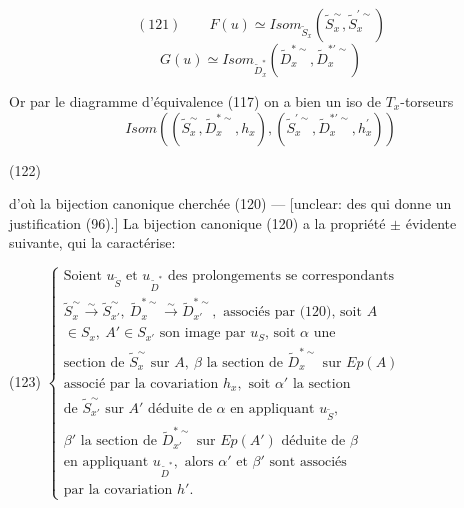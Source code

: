 $$ (121) \qquad F(u) \simeq Isom_{\tilde{S}_x}(\tilde{S}_x^\sim, \tilde{S}_x^{\prime \sim}) $$
$$ G(u) \simeq Isom_{\tilde{D}_x^*}(\tilde{D}_x^{*\sim}, \tilde{D}_x^{* \prime \sim}) $$

Or par le diagramme d'équivalence (117) on
a bien un iso de $T_x$-torseurs
$$ Isom((\tilde{S}_x^\sim, \tilde{D}_x^{*\sim}, h_x), (\tilde{S}_x^{\prime \sim}, \tilde{D}_x^{* \prime \sim}, h_x^\prime)) $$

(122)

d'où la bijection canonique cherchée (120) —
[unclear: des qui donne un justification (96).]
La bijection canonique (120) a la
propriété $\pm$ évidente suivante, qui la caractérise:

(123) $\begin{cases}
\text{Soient } u_{\tilde{S}} \text{ et } u_{\tilde{D}^*} \text{ des prolongements se correspondants} \\
\tilde{S}_x^\sim \xrightarrow{\sim} \tilde{S}_{x'}^\sim, \ \tilde{D}_x^{*\sim} \xrightarrow{\sim} \tilde{D}_{x'}^{* \sim}, \text{ associés par (120), soit } A \\
\in S_x, \ A' \in S_{x'} \text{ son image par } u_S \text{, soit } \alpha \text{ une} \\
\text{section de } \tilde{S}_x^\sim \text{ sur } A, \ \beta \text{ la section de } \tilde{D}_x^{*\sim} \text{ sur } Ep(A) \\
\text{associé par la covariation } h_x, \text{ soit } \alpha' \text{ la section} \\
\text{de } \tilde{S}_{x'}^\sim \text{ sur } A' \text{ déduite de } \alpha \text{ en appliquant } u_{\tilde{S}}, \\
\beta' \text{ la section de } \tilde{D}_{x'}^{* \sim} \text{ sur } Ep(A') \text{ déduite de } \beta \\
\text{en appliquant } u_{\tilde{D}^*}, \text{ alors } \alpha' \text{ et } \beta' \text{ sont associés} \\
\text{par la covariation } h'.
\end{cases}$

\newpage

